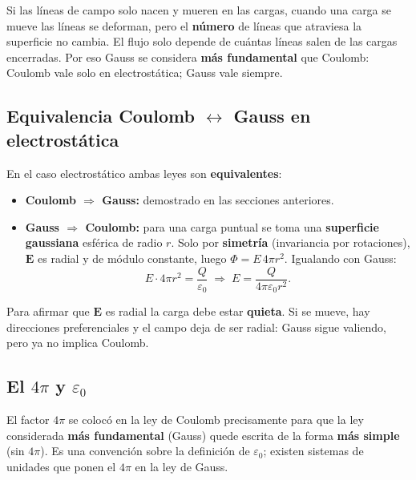 \documentclass[12pt,a4paper]{article}
\begin{document}
\begin{notebox}
  Si las líneas de campo solo nacen y mueren en las cargas, cuando una
  carga se mueve las líneas se deforman, pero el \textbf{número} de
  líneas que atraviesa la superficie no cambia. El flujo solo depende
  de cuántas líneas salen de las cargas encerradas. Por eso Gauss se
  considera \textbf{más fundamental} que Coulomb: Coulomb vale solo en
  electrostática; Gauss vale siempre.
\end{notebox}

\subsection{Equivalencia Coulomb \texorpdfstring{$\leftrightarrow$}{<->}
            Gauss en electrostática}

En el caso electrostático ambas leyes son \textbf{equivalentes}:
\begin{itemize}[nosep]
  \item \textbf{Coulomb $\Rightarrow$ Gauss:} demostrado en las
        secciones anteriores.
  \item \textbf{Gauss $\Rightarrow$ Coulomb:} para una carga puntual se
        toma una \textbf{superficie gaussiana} esférica de radio $r$.
        Solo por \textbf{simetría} (invariancia por rotaciones),
        $\mathbf{E}$ es radial y de módulo constante, luego
        $\Phi = E\, 4\pi r^{2}$. Igualando con Gauss:
        \[
        E \cdot 4\pi r^{2} = \frac{Q}{\varepsilon_0}
        \;\Longrightarrow\;
        E = \frac{Q}{4\pi\varepsilon_0 r^{2}} .
        \]
\end{itemize}

\begin{warnbox}
  Para afirmar que $\mathbf{E}$ es radial la carga debe estar
  \textbf{quieta}. Si se mueve, hay direcciones preferenciales y el
  campo deja de ser radial: Gauss sigue valiendo, pero ya no implica
  Coulomb.
\end{warnbox}

\subsection{El \texorpdfstring{$4\pi$}{4pi} y
            \texorpdfstring{$\varepsilon_0$}{epsilon0}}

El factor $4\pi$ se colocó en la ley de Coulomb precisamente para que
la ley considerada \textbf{más fundamental} (Gauss) quede escrita de la
forma \textbf{más simple} (sin $4\pi$). Es una convención sobre la
definición de $\varepsilon_0$; existen sistemas de unidades que ponen
el $4\pi$ en la ley de Gauss.
\end{document}
